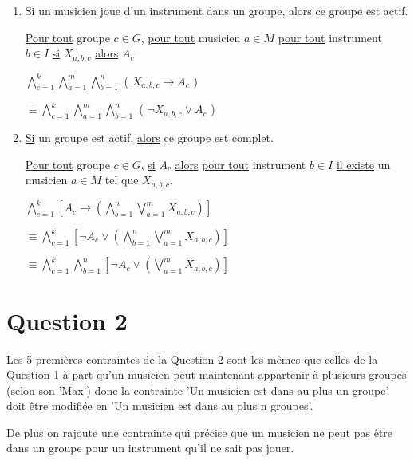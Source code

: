\documentclass[a4paper,10pt]{article}
\begin{document}
\begin{enumerate}

 \item Si un musicien joue d'un instrument dans un groupe, alors ce groupe est actif.
 
    \underline{Pour tout} groupe $c \in G$, \underline{pour tout} musicien $a \in M$ \underline{pour tout} instrument $b \in I$  \underline{si} $X_{a,b,c}$ \underline{alors} $A_c$.
    
    $ \bigwedge \limits_{c=1}^{k} \bigwedge \limits_{a=1}^{m} \bigwedge \limits_{b=1}^{n}$ ( $ X_{a,b,c} \rightarrow A_c$ )
    
    $\equiv \bigwedge \limits_{c=1}^{k} \bigwedge \limits_{a=1}^{m} \bigwedge \limits_{b=1}^{n}$ ( $ \neg  X_{a,b,c} \vee A_c$ )

 
 
 \item \underline{Si} un groupe est actif, \underline {alors} ce groupe est complet.
 
    \underline{Pour tout} groupe $c \in G$, \underline{si} $A_c$ \underline{alors} \underline{pour tout} instrument $b \in I$ \underline{il existe} un musicien $a \in M$
    tel que $X_{a,b,c}$.
    
    
    $ \bigwedge \limits_{c=1}^{k} [ A_c \rightarrow (  \bigwedge \limits_{b=1}^{n} \bigvee \limits_{a=1}^{m} X_{a,b,c} ) ]$
    
    $\equiv \bigwedge \limits_{c=1}^{k} [ \neg A_c \vee (  \bigwedge \limits_{b=1}^{n} \bigvee \limits_{a=1}^{m} X_{a,b,c} ) ]$
    
    $\equiv \bigwedge \limits_{c=1}^{k} \bigwedge \limits_{b=1}^{n}  [ \neg A_c \vee ( \bigvee \limits_{a=1}^{m} X_{a,b,c} ) ]$
 
\end{enumerate}

 

 
 
\section{Question 2}

Les 5 premières contraintes de la Question 2 sont les mêmes que celles de la Question 1 à part qu'un musicien peut maintenant appartenir à plusieurs groupes (selon son 'Max') donc la contrainte 'Un musicien est dans au plus un groupe'  doit être modifiée en 'Un musicien est dans au plus n groupes'.

De plus on rajoute une contrainte qui précise que un musicien ne peut pas être dans un groupe pour un instrument qu'il ne sait pas jouer.
\end{document}
